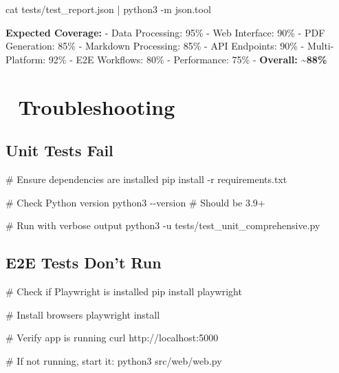 \documentclass[
  11pt,
  oneside,
  openany]{scrbook}
\newenvironment{Shaded}{\begin{snugshade}}{\end{snugshade}}
\newcommand{\AttributeTok}[1]{\textcolor[rgb]{0.40,0.45,0.13}{#1}}
\newcommand{\CommentTok}[1]{\textcolor[rgb]{0.37,0.37,0.37}{#1}}
\newcommand{\ExtensionTok}[1]{\textcolor[rgb]{0.00,0.23,0.31}{#1}}
\newcommand{\FunctionTok}[1]{\textcolor[rgb]{0.28,0.35,0.67}{#1}}
\newcommand{\KeywordTok}[1]{\textcolor[rgb]{0.00,0.23,0.31}{#1}}
\newcommand{\NormalTok}[1]{\textcolor[rgb]{0.00,0.23,0.31}{#1}}
\begin{document}
\begin{Shaded}
\begin{Highlighting}[]
\FunctionTok{cat}\NormalTok{ tests/test\_report.json }\KeywordTok{|} \ExtensionTok{python3} \AttributeTok{{-}m}\NormalTok{ json.tool}
\end{Highlighting}
\end{Shaded}

\textbf{Expected Coverage:} - Data Processing: 95\% - Web Interface:
90\% - PDF Generation: 85\% - Markdown Processing: 85\% - API Endpoints:
90\% - Multi-Platform: 92\% - E2E Workflows: 80\% - Performance: 75\% -
\textbf{Overall: \textasciitilde88\%}

\section{🔧 Troubleshooting}\label{troubleshooting}

\subsection{Unit Tests Fail}\label{unit-tests-fail}

\begin{Shaded}
\begin{Highlighting}[]
\CommentTok{\# Ensure dependencies are installed}
\ExtensionTok{pip}\NormalTok{ install }\AttributeTok{{-}r}\NormalTok{ requirements.txt}

\CommentTok{\# Check Python version}
\ExtensionTok{python3} \AttributeTok{{-}{-}version}  \CommentTok{\# Should be 3.9+}

\CommentTok{\# Run with verbose output}
\ExtensionTok{python3} \AttributeTok{{-}u}\NormalTok{ tests/test\_unit\_comprehensive.py}
\end{Highlighting}
\end{Shaded}

\subsection{E2E Tests Don't Run}\label{e2e-tests-dont-run}

\begin{Shaded}
\begin{Highlighting}[]
\CommentTok{\# Check if Playwright is installed}
\ExtensionTok{pip}\NormalTok{ install playwright}

\CommentTok{\# Install browsers}
\ExtensionTok{playwright}\NormalTok{ install}

\CommentTok{\# Verify app is running}
\ExtensionTok{curl}\NormalTok{ http://localhost:5000}

\CommentTok{\# If not running, start it:}
\ExtensionTok{python3}\NormalTok{ src/web/web.py}
\end{Highlighting}
\end{Shaded}
\end{document}
